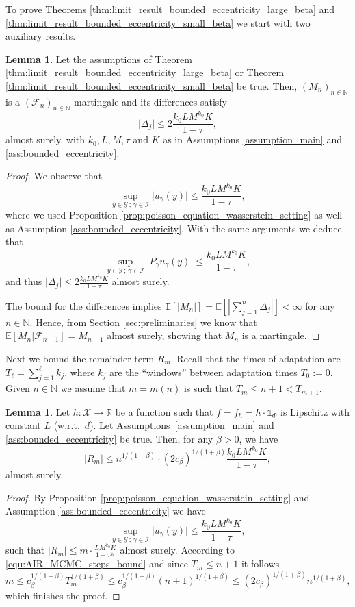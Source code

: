 \documentclass[12pt]{article}
\theoremstyle{definition}
\newtheorem{lem}[thm]{Lemma}
\newcommand{\N}{\mathbb{N}}
\newcommand{\E}{\mathbb{E}}
\newcommand{\R}{\mathbb{R}}
\newcommand{\cX}{\mathcal{X}}
\newcommand{\cY}{\mathcal{Y}}
\begin{document}
To prove Theorems \ref{thm:limit_result_bounded_eccentricity_large_beta} and \ref{thm:limit_result_bounded_eccentricity_small_beta} we start with two auxiliary results.
\begin{lem}\label{lem:martingale_bound_for_bounded_eccentricity}
	{Let the assumptions of Theorem \ref{thm:limit_result_bounded_eccentricity_large_beta} or Theorem \ref{thm:limit_result_bounded_eccentricity_small_beta} be true. Then, $(M_n)_{n \in \N}$ is a $(\mathcal{F}_n)_{n \in \N}$ martingale and its differences satisfy}
	\[
	\vert \Delta_j \vert \le 2 \frac{k_0L M^{k_0} K}{1- \tau},
	\]
	almost surely, with $k_0, L, M , \tau$ and $K$ as in Assumptions \ref{assumption_main} and \ref{ass:bounded_eccentricity}. 
\end{lem}
\begin{proof}
	We observe that 
	\[
	\sup_{y \in \cY \,; \, \gamma \in \mathcal{I}} \vert u_\gamma (y) \vert \leq \frac{k_0L M^{k_0} K}{1- \tau},
	\]
	where we used Proposition \ref{prop:poisson_equation_wasserstein_setting} as well as Assumption \ref{ass:bounded_eccentricity}. 
	With the same arguments we deduce that 
	\[
	\sup_{y \in \cY \,; \, \gamma \in \mathcal{I}} \vert P_\gamma u_\gamma (y) \vert \leq \frac{k_0L M^{k_0} K}{1- \tau},
	\]
	and thus $\vert \Delta_j \vert \leq 2 \frac{k_0L M^{k_0} K}{1- \tau}$ almost surely.
	
	The bound for the differences implies $\E [\vert M_n\vert] = \E\left[\left\vert \sum_{j=1}^n \Delta_j \right\vert  \right] <\infty$ for any $n \in \N$.
	Hence, from Section \ref{sec:preliminaries} we know that $\E [M_n \vert \mathcal{F}_{n-1}] = M_{n-1}$ almost surely, showing that $M_n$ is a martingale. 
\end{proof}

Next we bound the remainder term $R_m$. 
Recall that the times of adaptation are $T_\ell = \sum_{j=1}^\ell k_j $, where $k_j$ are the ``windows'' between adaptation times $T_0 := 0$. 
Given $n \in \N$ we assume that $m = m(n)$ is such that $T_m \leq n+1< T_{m+1}$.
\begin{lem}\label{lem:R_m_bound_for_bounded_eccentricity}
	Let $h \colon \cX \to \R$ be a function such that $f = f_h = h \cdot \mathds{1}_\Phi$ is Lipschitz with constant $L$ (w.r.t.~$d$). 
	Let Assumptions~\ref{assumption_main} and \ref{ass:bounded_eccentricity} be true. 
	Then, for any $\beta>0$, we have
	\[
	\vert R_m \vert \leq  n^{1/(1+\beta)} \cdot (2c_\beta)^{1/(1+\beta)}\frac{k_0L M^{k_0} K}{1- \tau},
	\]
	almost surely. 
\end{lem}
\begin{proof}
	By Proposition \ref{prop:poisson_equation_wasserstein_setting} and  Assumption \ref{ass:bounded_eccentricity} we have
	\[
	\sup_{y \in \cY \,; \, \gamma \in \mathcal{I}} \vert u_\gamma (y) \vert \leq \frac{k_0L M^{k_0} K}{1- \tau},
	\]
	such that $\vert R_m \vert \le m \cdot  \frac{L M^{k_0} K}{1- \tau^{k_0}}$ almost surely. 
	According to \eqref{equ:AIR_MCMC_steps_bound} and since $T_m \le n+1$ it follows 
	\[
	m \le c_\beta^{1/(1+\beta)} T_m^{1/(1+\beta)} \le  c_\beta^{1/(1+\beta)} (n+1)^{1/(1+\beta)} \leq (2c_\beta)^{1/(1+\beta)} n^{1/(1+\beta)} ,
	\]
	which finishes the proof. 
\end{proof}
\end{document}
